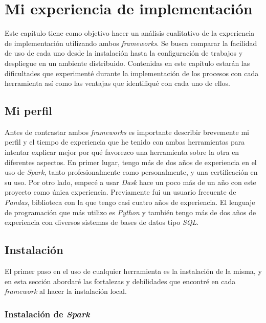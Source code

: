 \chapter{Mi experiencia de implementación}

\noindent Este capítulo tiene como objetivo hacer un análisis cualitativo de la experiencia de implementación utilizando ambos \textit{frameworks}. Se busca comparar la facilidad de uso de cada uno desde la instalación hasta la configuración de trabajos y despliegue en un ambiente distribuido. Contenidas en este capítulo estarán las dificultades que experimenté durante la implementación de los procesos con cada herramienta así como las ventajas que identifiqué con cada uno de ellos.

\section{Mi perfil}

Antes de contrastar ambos \textit{frameworks} es importante describir brevemente mi perfil y el tiempo de experiencia que he tenido con ambas herramientas para intentar explicar mejor por qué favorezco una herramienta sobre la otra en diferentes aspectos. En primer lugar, tengo más de dos años de experiencia en el uso de \textit{Spark}, tanto profesionalmente como personalmente, y una certificación en su uso. Por otro lado, empecé a usar \textit{Dask} hace un poco más de un año con este proyecto como única experiencia. Previamente fui un usuario frecuente de \textit{Pandas}, biblioteca con la que tengo casi cuatro años de experiencia. El lenguaje de programación que más utilizo es \textit{Python} y también tengo más de dos años de experiencia con diversos sistemas de bases de datos tipo \textit{SQL}.

\section{Instalación}

El primer paso en el uso de cualquier herramienta es la instalación de la misma, y en esta sección abordaré las fortalezas y debilidades que encontré en cada \textit{framework} al hacer la instalación local.

\subsection{Instalación de \textit{Spark}}

